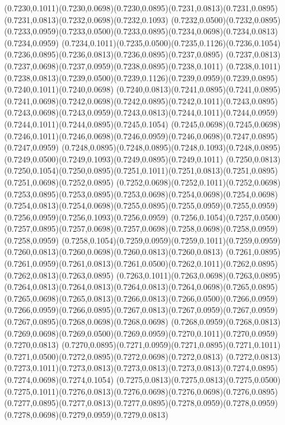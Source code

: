 (0.7230,0.1011)(0.7230,0.0698)(0.7230,0.0895)(0.7231,0.0813)(0.7231,0.0895)(0.7231,0.0813)(0.7232,0.0698)(0.7232,0.1093)
(0.7232,0.0500)(0.7232,0.0895)(0.7233,0.0959)(0.7233,0.0500)(0.7233,0.0895)(0.7234,0.0698)(0.7234,0.0813)(0.7234,0.0959)
(0.7234,0.1011)(0.7235,0.0500)(0.7235,0.1126)(0.7236,0.1054)(0.7236,0.0895)(0.7236,0.0813)(0.7236,0.0895)(0.7237,0.0895)
(0.7237,0.0813)(0.7237,0.0698)(0.7237,0.0959)(0.7238,0.0895)(0.7238,0.1011)
\PST@Solid(0.7238,0.1011)(0.7238,0.0813)(0.7239,0.0500)(0.7239,0.1126)(0.7239,0.0959)(0.7239,0.0895)(0.7240,0.1011)(0.7240,0.0698)
(0.7240,0.0813)(0.7241,0.0895)(0.7241,0.0895)(0.7241,0.0698)(0.7242,0.0698)(0.7242,0.0895)(0.7242,0.1011)(0.7243,0.0895)
(0.7243,0.0698)(0.7243,0.0959)(0.7243,0.0813)(0.7244,0.1011)(0.7244,0.0959)(0.7244,0.1011)(0.7244,0.0895)(0.7245,0.1054)
(0.7245,0.0698)(0.7245,0.0698)(0.7246,0.1011)(0.7246,0.0698)(0.7246,0.0959)(0.7246,0.0698)(0.7247,0.0895)(0.7247,0.0959)
(0.7248,0.0895)(0.7248,0.0895)(0.7248,0.1093)(0.7248,0.0895)(0.7249,0.0500)(0.7249,0.1093)(0.7249,0.0895)(0.7249,0.1011)
(0.7250,0.0813)(0.7250,0.1054)(0.7250,0.0895)(0.7251,0.1011)(0.7251,0.0813)(0.7251,0.0895)(0.7251,0.0698)(0.7252,0.0895)
(0.7252,0.0698)(0.7252,0.1011)(0.7252,0.0698)(0.7253,0.0895)(0.7253,0.0895)(0.7253,0.0698)(0.7254,0.0698)(0.7254,0.0698)
(0.7254,0.0813)(0.7254,0.0698)(0.7255,0.0895)(0.7255,0.0959)(0.7255,0.0959)(0.7256,0.0959)(0.7256,0.1093)(0.7256,0.0959)
(0.7256,0.1054)(0.7257,0.0500)(0.7257,0.0895)(0.7257,0.0698)(0.7257,0.0698)(0.7258,0.0698)(0.7258,0.0959)(0.7258,0.0959)
(0.7258,0.1054)(0.7259,0.0959)(0.7259,0.1011)(0.7259,0.0959)(0.7260,0.0813)(0.7260,0.0698)(0.7260,0.0813)(0.7260,0.0813)
(0.7261,0.0895)(0.7261,0.0959)(0.7261,0.0813)(0.7261,0.0500)(0.7262,0.1011)(0.7262,0.0895)(0.7262,0.0813)(0.7263,0.0895)
(0.7263,0.1011)(0.7263,0.0698)(0.7263,0.0895)(0.7264,0.0813)(0.7264,0.0813)(0.7264,0.0813)(0.7264,0.0698)(0.7265,0.0895)
(0.7265,0.0698)(0.7265,0.0813)(0.7266,0.0813)(0.7266,0.0500)(0.7266,0.0959)
\PST@Solid(0.7266,0.0959)(0.7266,0.0895)(0.7267,0.0813)(0.7267,0.0959)(0.7267,0.0959)(0.7267,0.0895)(0.7268,0.0698)(0.7268,0.0698)
(0.7268,0.0959)(0.7268,0.0813)(0.7269,0.0698)(0.7269,0.0500)(0.7269,0.0959)(0.7270,0.1011)(0.7270,0.0959)(0.7270,0.0813)
(0.7270,0.0895)(0.7271,0.0959)(0.7271,0.0895)(0.7271,0.1011)(0.7271,0.0500)(0.7272,0.0895)(0.7272,0.0698)(0.7272,0.0813)
(0.7272,0.0813)(0.7273,0.1011)(0.7273,0.0813)(0.7273,0.0813)(0.7273,0.0813)(0.7274,0.0895)(0.7274,0.0698)(0.7274,0.1054)
(0.7275,0.0813)(0.7275,0.0813)(0.7275,0.0500)(0.7275,0.1011)(0.7276,0.0813)(0.7276,0.0698)(0.7276,0.0698)(0.7276,0.0895)
(0.7277,0.0895)(0.7277,0.0813)(0.7277,0.0895)(0.7278,0.0959)(0.7278,0.0959)(0.7278,0.0698)(0.7279,0.0959)(0.7279,0.0813)
